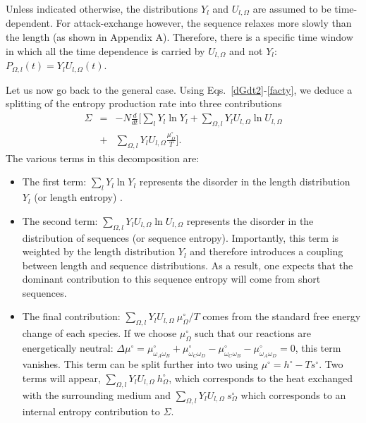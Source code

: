 \documentclass[
	amsmath,
	amssymb,
	a4paper,
	aip,		%
	jcp,		%
	reprint, twocolumn  %
	fleqn,
	showpacs,
	floatfix
]{revtex4-1}
\newcommand{\bea}{\begin{eqnarray}}
\newcommand{\eea}{\end{eqnarray}}
\begin{document}
Unless indicated otherwise, the distributions $Y_l$ and $U_{l,\Omega}$ are assumed to be time-dependent.
For attack-exchange however, the sequence relaxes more slowly than the length (as shown in Appendix A). 
Therefore, there is a specific time window in which all the time dependence is carried by 
$U_{l,\Omega}$ and not $Y_l$: $P_{\Omega,l}(t)=Y_{l} U_{l,\Omega}(t)$. 

Let us now go back to the general case. Using Eqs.~\eqref{dGdt2}-\eqref{facty}, we deduce a  
splitting of the entropy production rate into three contributions
\bea
\Sigma &=& -N \frac{d}{dt} \bigg[ \sum_{ l} Y_{l} \ln Y_{l} +  \sum_{\Omega, l } Y_{l}  U_{l,\Omega} \ln U_{l,\Omega} 
\label{prodentr6} \nonumber \\
&+& \sum_{\Omega,l} Y_{l}  U_{l,\Omega} \frac{\mu^{\circ}_{\Omega}}{T} \bigg] .
\eea
The various terms in this decomposition are:
\begin{itemize}
	\item The first term: $\sum_{ l} Y_{l} \ln Y_{l}$ represents the disorder in the length distribution $Y_{l}$ (or length entropy) . 
	
	\item The second term: $\sum_{\Omega, l } Y_{l}  U_{l,\Omega} \ln U_{l,\Omega}$ represents the disorder in the distribution of sequences (or sequence 
	entropy). Importantly, this term is weighted by the length distribution $Y_{l}$ and therefore introduces a coupling between length and sequence 
	distributions. As a result, one expects that the dominant contribution to this sequence entropy will come from short sequences. 
	\item The final contribution: $\sum_{\Omega,l} Y_{l} U_{l,\Omega} \ \mu^{\circ}_{\Omega}/T$ comes from the standard free energy change of each species. 
If we choose $\mu^{\circ}_{\Omega}$ such that our reactions are energetically neutral: $\Delta \mu^{\circ}=\mu^{\circ}_{\omega_{A}\omega_{B}} +
 \mu^{\circ}_{\omega_{C} \omega_{D}} - \mu^{\circ}_{\omega_{C}\omega_{B}} -\mu^{\circ}_{\omega_{A}\omega_{D}}=0$, this term vanishes.	
This term can be split further into two using $\mu^\circ=h^\circ - T s^\circ$. Two 
terms will appear, $\sum_{\Omega,l} Y_{l} U_{l,\Omega} \ h^{\circ}_{\Omega}$, which corresponds to the heat exchanged with the 
surrounding medium and $\sum_{\Omega,l} Y_{l} U_{l,\Omega} \ s^{\circ}_{\Omega}$ which corresponds to an internal entropy 
contribution to $\Sigma$.
\end{itemize}
\end{document}
